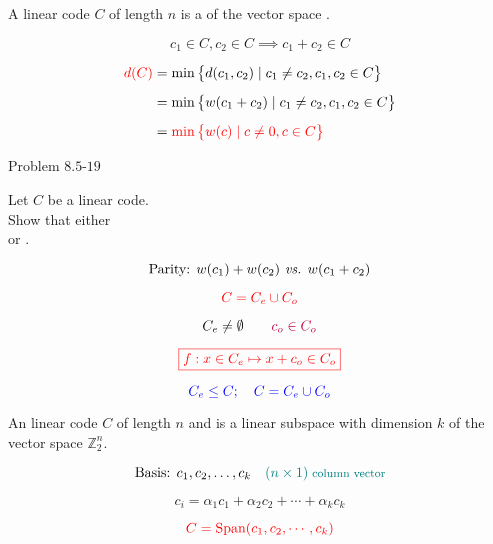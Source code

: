 
\begin{frame}
  \begin{definition}
	A linear code $C$ of length $n$ is a  of the vector space  .
  \end{definition}

  \[
	c_1 \in C, c_2 \in C \implies c_1 + c_2 \in C
  \]

  \pause
  \begin{align*}
    \textcolor{red}{d(C)} &= \min \big\{ d(c_1, c_2) \mid c_1 \neq c_2, c_1, c_2 \in C \big\} \\[5pt]
			   &= \min \big\{ w(c_1 + c_2) \mid c_1 \neq c_2, c_1, c_2 \in C \big\} \\[5pt]
			   &= \textcolor{red}{\min \big\{ w(c) \mid c \neq 0, c \in C \big\}}
  \end{align*}
\end{frame}

\begin{frame}
  \begin{exampleblock}{Problem $8.5$-$19$}
	\begin{center}
	  Let $C$ be a linear code. \\[5pt]

	  Show that either  \\[3pt]
	  or .
	\end{center}
  \end{exampleblock}

  \pause
  \[
	\text{Parity: } w(c_1) + w(c_2) \emph{ vs. } w(c_1 + c_2)
  \]

  \pause
  \[
	\textcolor{red}{C = C_e \cup C_o}
  \]

  \pause
  \[
	C_e \neq \emptyset \qquad \textcolor{purple}{c_o \in C_o}
  \]

  \pause
  \[
	\textcolor{red}{\boxed{f: x \in C_e \mapsto x + c_o \in C_o}}
  \]

  \pause
  \[
	\textcolor{blue}{C_e \le C; \quad C = C_e \cup C_o}
  \]
\end{frame}

\begin{frame}
  \begin{definition}
	An  linear code $C$ of length $n$ and  is a linear subspace with dimension $k$ of the vector space $\mathbb{Z}_2^n$.
  \end{definition}

  \pause
  \[
	\text{Basis: } c_1, c_2, \dots, c_k \quad \textcolor{teal}{(n \times 1)\; \text{\footnotesize column vector}}
  \]

  \[
	c_i = \alpha_1 c_1 + \alpha_2 c_2 + \cdots + \alpha_k c_k
  \]

  \pause
  \[
	\textcolor{red}{C = \text{Span}(c_1, c_2, \cdots, c_k)}
  \]
\end{frame}

